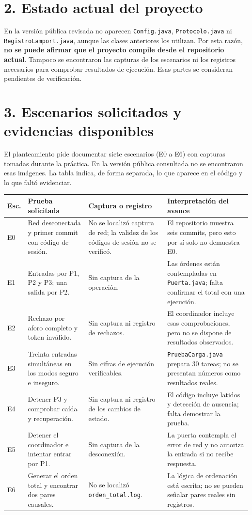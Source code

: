 \documentclass[11pt,a4paper]{article}
\begin{document}
\section*{2. Estado actual del proyecto}
En la versión pública revisada no aparecen \texttt{Config.java}, \texttt{Protocolo.java} ni \texttt{RegistroLamport.\allowbreak java}, aunque las clases anteriores los utilizan. Por esta razón, \textbf{no se puede afirmar que el proyecto compile desde el repositorio actual}. Tampoco se encontraron las capturas de los escenarios ni los registros necesarios para comprobar resultados de ejecución. Esas partes se consideran pendientes de verificación.

\newpage
\section*{3. Escenarios solicitados y evidencias disponibles}
El planteamiento pide documentar siete escenarios (E0 a E6) con capturas tomadas durante la práctica. En la versión pública consultada no se encontraron esas imágenes. La tabla indica, de forma separada, lo que aparece en el código y lo que faltó evidenciar.

\small
\begin{tabular}{@{}p{0.82cm}p{4.3cm}p{4.2cm}p{4.85cm}@{}}
\toprule
\textbf{Esc.} & \textbf{Prueba solicitada} & \textbf{Captura o registro} & \textbf{Interpretación del avance} \\
\midrule
E0 & Red desconectada y primer commit con código de sesión. & No se localizó captura de red; la validez de los códigos de sesión no se verificó. & El repositorio muestra seis commits, pero esto por sí solo no demuestra E0. \\
E1 & Entradas por P1, P2 y P3; una salida por P2. & Sin captura de la operación. & Las órdenes están contempladas en \texttt{Puerta.java}; falta confirmar el total con una ejecución. \\
E2 & Rechazo por aforo completo y token inválido. & Sin captura ni registro de rechazos. & El coordinador incluye esas comprobaciones, pero no se dispone de resultados observados. \\
E3 & Treinta entradas simultáneas en los modos seguro e inseguro. & Sin cifras de ejecución verificables. & \texttt{PruebaCarga.java} prepara 30 tareas; no se presentan números como resultados reales. \\
E4 & Detener P3 y comprobar caída y recuperación. & Sin captura ni registro de los cambios de estado. & El código incluye latidos y detección de ausencia; falta demostrar la prueba. \\
E5 & Detener el coordinador e intentar entrar por P1. & Sin captura de la desconexión. & La puerta contempla el error de red y no autoriza la entrada si no recibe respuesta. \\
E6 & Generar el orden total y encontrar dos pares causales. & No se localizó \texttt{orden\_total.log}. & La lógica de ordenación está escrita; no se pueden señalar pares reales sin registros. \\
\bottomrule
\end{tabular}
\normalsize
\end{document}
